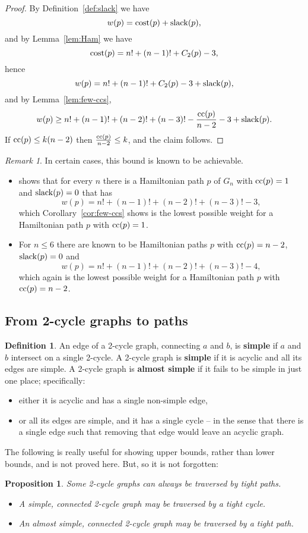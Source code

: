 \documentclass[a4paper]{article}
\newtheorem{prop}{Proposition}
\theoremstyle{definition}
\newtheorem{defn}{Definition}[section]
\theoremstyle{remark}
\newtheorem*{remark}{Remark}
\let\definiendum\textbf
\begin{document}
\begin{proof}
    By Definition~\ref{def:slack} we have
    \[
        w(p) = \mathrm{cost}(p) + \mathrm{slack}(p),
    \]
    and by Lemma~\ref{lem:Ham} we have
    \[
        \mathrm{cost}(p) = n! + (n-1)! + C_2(p) - 3,
    \]
    hence \[
        w(p) = n! + (n-1)! + C_2(p) - 3 + \mathrm{slack}(p),
    \]
    and by Lemma~\ref{lem:few-ccs},
    \[
        w(p) \ge n! + (n-1)! + (n-2)! + (n-3)! - \frac{\mathrm{cc}(p)}{n-2} - 3 + \mathrm{slack}(p).
    \]
    If $\mathrm{cc}(p)\le k(n-2)$ then $\frac{\mathrm{cc}(p)}{n-2}\le k$, and the claim follows.
\end{proof}
\begin{remark}
In certain cases, this bound is known to be achievable.
\begin{itemize}
    \item \citet{Egan2018} shows that for every $n$ there is a Hamiltonian path $p$ of $G_n$ with $\mathrm{cc}(p)=1$ and $\mathrm{slack}(p)=0$ that has
    \[
        w(p) = n! + (n-1)! + (n-2)! + (n-3)! - 3,
    \]
    which Corollary~\ref{cor:few-ccs} shows is the lowest possible weight for a Hamiltonian path $p$ with $\mathrm{cc}(p)=1$.
    \item For $n\le 6$ there are known to be Hamiltonian paths $p$ with $\mathrm{cc}(p)=n-2$, $\mathrm{slack}(p)=0$ and \[
        w(p) = n! + (n-1)! + (n-2)! + (n-3)! - 4,
    \]
    which again is the lowest possible weight for a Hamiltonian path $p$ with $\mathrm{cc}(p)=n-2$.
\end{itemize}
\end{remark}

\subsection{From 2-cycle graphs to paths}
\begin{defn}
    An edge of a 2-cycle graph, connecting $a$ and $b$, is \definiendum{simple} if $a$ and $b$ intersect on a single 2-cycle.
    A 2-cycle graph is \definiendum{simple} if it is acyclic and all its edges are simple.
    A 2-cycle graph is \definiendum{almost simple} if it fails to be simple in just one place; specifically:
    \begin{itemize}
        \item either it is acyclic and has a single non-simple edge,
        \item or all its edges are simple, and it has a single cycle -- in the sense that there is a single edge such that removing that edge would leave an acyclic graph.
    \end{itemize}
\end{defn}
The following is really useful for showing upper bounds, rather than lower bounds, and is not proved here. But, so it is not forgotten:
\begin{prop}
Some 2-cycle graphs can always be traversed by tight paths.

\begin{itemize}
    \item A simple, connected 2-cycle graph may be traversed by a tight cycle.
    \item An almost simple, connected 2-cycle graph may be traversed by a tight path.
\end{itemize}
\end{prop}



\end{document}
